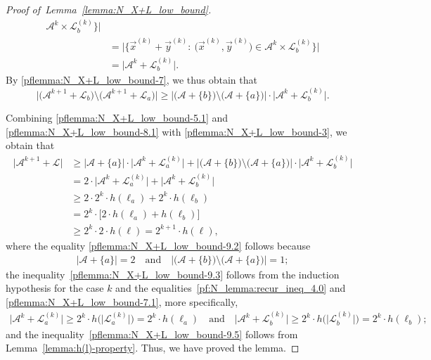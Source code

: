 \documentclass[11pt,draftclsnofoot,onecolumn]{IEEEtran}
\begin{document}
\begin{proof}[Proof of~Lemma~\ref{lemma:N_X+L_low_bound}]
\begin{align}
\mathcal{A}^{k}\times\mathcal{L}^{(k)}_{b}\Big\}\Big|\nonumber\\
&=\Big|\Big\{\vec{x}^{(k)}+\vec{y}^{(k)}:~\big(\vec{x}^{(k)},\vec{y}^{(k)}\big)\in
\mathcal{A}^{k}\times\mathcal{L}^{(k)}_{b}\Big\}\Big|\nonumber\\
&=\big|\mathcal{A}^{k}+\mathcal{L}^{(k)}_{b}\big|.\nonumber%
\end{align}
By \eqref{pflemma:N_X+L_low_bound-7}, we thus  obtain that
\begin{equation}
\big|\big(\mathcal{A}^{k+1}+\mathcal{L}_b\big)\setminus\big(\mathcal{A}^{k+1}+\mathcal{L}_a\big)\big|\geq
\big|\big(\mathcal{A}+\{b\}\big)\setminus\big(\mathcal{A}+\{a\}\big)\big|\cdot \big |\mathcal{A}^k+\mathcal{L}_b^{(k)}\big|.\label{pflemma:N_X+L_low_bound-8.1}
\end{equation}



Combining \eqref{pflemma:N_X+L_low_bound-5.1} and \eqref{pflemma:N_X+L_low_bound-8.1} with \eqref{pflemma:N_X+L_low_bound-3},
we obtain that
\begin{align}
\big|\mathcal{A}^{k+1}+\mathcal{L}\big|
&\geq \big|\mathcal{A}+\{a\}\big|\cdot \big|\mathcal{A}^k+\mathcal{L}_a^{(k)}\big|
 +\big|\big(\mathcal{A}+\{b\}\big)\setminus\big(\mathcal{A}+\{a\}\big)\big|\cdot \big |\mathcal{A}^k+\mathcal{L}_b^{(k)}\big|\nonumber\\
&= 2\cdot \big|\mathcal{A}^k+\mathcal{L}_a^{(k)}\big|
 +\big|\mathcal{A}^k+\mathcal{L}_b^{(k)}\big|\label{pflemma:N_X+L_low_bound-9.2}\\
 & \geq 2 \cdot 2^k \cdot h(\ell_a)+2^k\cdot h(\ell_b)\label{pflemma:N_X+L_low_bound-9.3}\\
 &=2^k \cdot \Big[2\cdot h(\ell_a)+h(\ell_b)\Big]\nonumber\\
& \geq 2^k\cdot 2\cdot h(\ell)=2^{k+1}\cdot h(\ell),\label{pflemma:N_X+L_low_bound-9.5}
\end{align}
where the equality
\eqref{pflemma:N_X+L_low_bound-9.2} follows because
\begin{align*}
\big|\mathcal{A}+\{a\}\big|=2\quad \text{and}\quad \big|\big(\mathcal{A}+\{b\}\big)\setminus\big(\mathcal{A}+\{a\}\big)\big|=1;
\end{align*}
the inequality~\eqref{pflemma:N_X+L_low_bound-9.3} follows from
 the induction hypothesis for the case $k$ and the equalities~\eqref{pf:N_lemma:recur_ineq_4.0} and \eqref{pflemma:N_X+L_low_bound-7.1}, more specifically,
 \begin{align*}
 \big|\mathcal{A}^k+\mathcal{L}_a^{(k)}\big|\geq 2^k\cdot h\big(\big|\mathcal{L}_{a}^{(k)}\big|\big)=2^k\cdot h(\ell_{a}) \quad\text{and} \quad \big|\mathcal{A}^k+\mathcal{L}_b^{(k)}\big|\geq 2^k\cdot h\big(\big|\mathcal{L}_{b}^{(k)}\big|\big)=2^k\cdot h(\ell_{b});
 \end{align*}
 and the inequality~\eqref{pflemma:N_X+L_low_bound-9.5} follows from Lemma~\ref{lemma:h(l)-property}. Thus, we have proved the lemma.
\end{proof}
\end{document}
